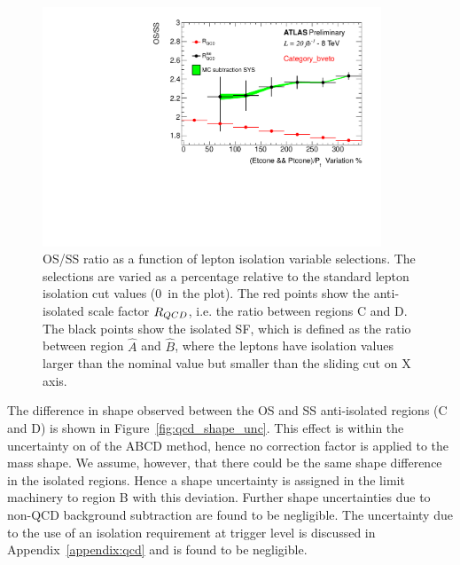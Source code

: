 \begin{figure}[tp]
	\begin{center}
	\includegraphics[page=5,width=0.9\textwidth]{figure/QCD/qcd_plot.pdf}
	\end{center}
	\caption{OS/SS ratio as a function of lepton isolation variable selections. The selections are varied as a percentage relative to
	the standard lepton isolation cut values (0~in the plot). 
	The red points show the anti-isolated scale factor $R_{QCD}$, i.e. the ratio between regions C and D.
	 The black points show the isolated SF, which is defined as the ratio between region $\hat{A}$ and $\hat{B}$, 
	 where the leptons have isolation values larger than the nominal value but smaller
	 than the sliding cut on X axis.
	 }
	\label{fig:os_ss_ratio}
\end{figure}

The difference in \mmc shape observed between the OS and SS anti-isolated regions (C and D) is shown in Figure~\ref{fig:qcd_shape_unc}.
This effect is within the  uncertainty on \rqcd of the ABCD method, hence no correction factor is applied to the mass shape. We assume, however, that there could be the same 
shape difference in the isolated regions. Hence a shape uncertainty is assigned in the limit machinery to region B with this deviation. Further 
shape uncertainties due to non-QCD background subtraction are found to be negligible. The uncertainty due to the use of an isolation 
requirement at trigger level is discussed in Appendix~\ref{appendix:qcd} and is found to be negligible.


